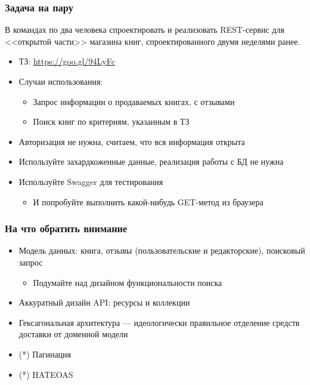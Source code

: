 \documentclass{../mcsslides}
\begin{document}
    
    \begin{frame}[plain]
        \titlepage
    \end{frame}

    \begin{frame}
        \frametitle{Задача на пару}
        В командах по два человека спроектировать и реализовать REST-сервис для <<открытой части>> магазина книг, спроектированного двумя неделями ранее.
        \begin{itemize}
            \item ТЗ: \url{https://goo.gl/94LyFc}
            \item Случаи использования:
            \begin{itemize}
                \item Запрос информации о продаваемых книгах, с отзывами
                \item Поиск книг по критериям, указанным в ТЗ
            \end{itemize}
            \item Авторизация не нужна, считаем, что вся информация открыта
            \item Используйте захардкоженные данные, реализация работы с БД не нужна
            \item Используйте Swagger для тестирования
            \begin{itemize}
                \item И попробуйте выполнить какой-нибудь GET-метод из браузера
            \end{itemize}
        \end{itemize}
    \end{frame}

    \begin{frame}
        \frametitle{На что обратить внимание}
        \begin{itemize}
            \item Модель данных: книга, отзывы (пользовательские и редакторские), поисковый запрос
            \begin{itemize}
                \item Подумайте над дизайном функциональности поиска
            \end{itemize}
            \item Аккуратный дизайн API: ресурсы и коллекции
            \item Гексагональная архитектура --- идеологически правильное отделение средств доставки от доменной модели
            \item (*) Пагинация
            \item (*) HATEOAS
        \end{itemize}
    \end{frame}
\end{document}

